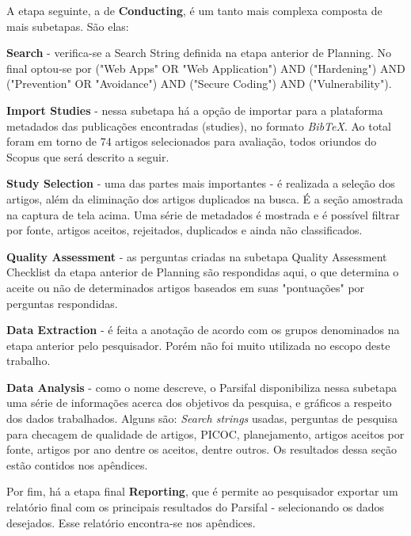 A etapa seguinte, a de \textbf{Conducting}, é um tanto mais complexa composta de mais subetapas. São elas:
\begin{alineas}
\item \textbf{Search} - verifica-se a Search String definida na etapa anterior de Planning. No final optou-se por ("Web Apps" OR "Web Application") AND ("Hardening") AND ("Prevention" OR "Avoidance") AND ("Secure Coding") AND ("Vulnerability").

\item \textbf{Import Studies} - nessa subetapa há a opção de importar para a plataforma metadados das publicações encontradas (studies), no formato \textit{BibTeX}. Ao total foram em torno de 74 artigos selecionados para avaliação, todos oriundos do Scopus que será descrito a seguir.

\item \textbf{Study Selection} - uma das partes mais importantes - é realizada a seleção dos artigos, além da eliminação dos artigos duplicados na busca. É a seção amostrada na captura de tela acima. Uma série de metadados é mostrada e é possível filtrar por fonte, artigos aceitos, rejeitados, duplicados e ainda não classificados.

\item \textbf{Quality Assessment} - as perguntas criadas na subetapa Quality Assessment Checklist da etapa anterior de Planning são respondidas aqui, o que determina o aceite ou não de determinados artigos baseados em suas "pontuações" por perguntas respondidas.

\item \textbf{Data Extraction} - é feita a anotação de acordo com os grupos denominados na etapa anterior pelo pesquisador. Porém não foi muito utilizada no escopo deste trabalho.

\item \textbf{Data Analysis} - como o nome descreve, o Parsifal disponibiliza nessa subetapa uma série de informações acerca dos objetivos da pesquisa, e gráficos a respeito dos dados trabalhados. Alguns são: \textit{Search strings} usadas, perguntas de pesquisa para checagem de qualidade de artigos, PICOC, planejamento, artigos aceitos por fonte, artigos por ano dentre os aceitos, dentre outros. Os resultados dessa seção estão contidos nos apêndices.

\end{alineas}

Por fim, há a etapa final \textbf{Reporting}, que é permite ao pesquisador exportar um relatório final com os principais resultados do Parsifal - selecionando os dados desejados. Esse relatório encontra-se nos apêndices.

